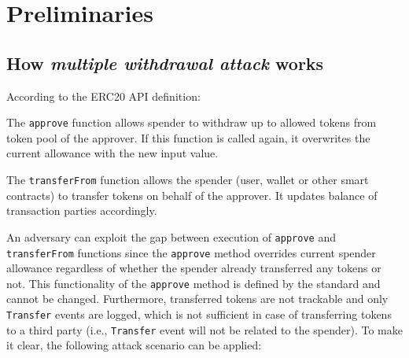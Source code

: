 
\section{Preliminaries}

\subsection{How \textit{multiple withdrawal attack} works}

\noindent According to the ERC20 API definition:

\begin{compactlist}
\item The \texttt{approve} function allows spender to withdraw up to allowed tokens from token pool of the approver. If this function is called again, it overwrites the current allowance with the new input value.
\item The \texttt{transferFrom} function allows the spender (\eg user, wallet or other smart contracts) to transfer tokens on behalf of the approver. It updates balance of transaction parties accordingly.
\end{compactlist}
An adversary can exploit the gap between execution of \texttt{approve} and \texttt{transferFrom} functions since the \texttt{approve} method overrides current spender allowance regardless of whether the spender already transferred any tokens or not. This functionality of the \texttt{approve} method is defined by the standard and cannot be changed. Furthermore, transferred tokens are not trackable and only \texttt{Transfer} events are logged, which is not sufficient in case of transferring tokens to a third party (i.e., \texttt{Transfer} event will not be related to the spender). To make it clear, the following attack scenario can be applied:

